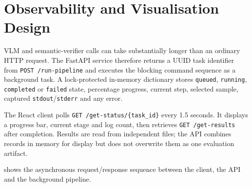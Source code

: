\documentclass[11pt,oneside]{report}
\begin{document}
\section{Observability and Visualisation Design}
VLM and semantic-verifier calls can take substantially longer than an ordinary
HTTP request. The FastAPI service therefore returns a UUID task identifier from
\texttt{POST /run-pipeline} and executes the blocking command sequence as a
background task. A lock-protected in-memory dictionary stores
\texttt{queued}, \texttt{running}, \texttt{completed} or \texttt{failed}
state, percentage progress, current step, selected sample, captured
\texttt{stdout}/\texttt{stderr} and any error.

The React client polls \texttt{GET /get-status/\{task\_id\}} every 1.5 seconds.
It displays a progress bar, current stage and log count, then retrieves
\texttt{GET /get-results} after completion. Results are read from independent
 files; the API combines records in memory for
display but does not overwrite them as one evaluation artifact.

 shows the asynchronous request/response sequence between
the client, the API and the background pipeline.
\end{document}
